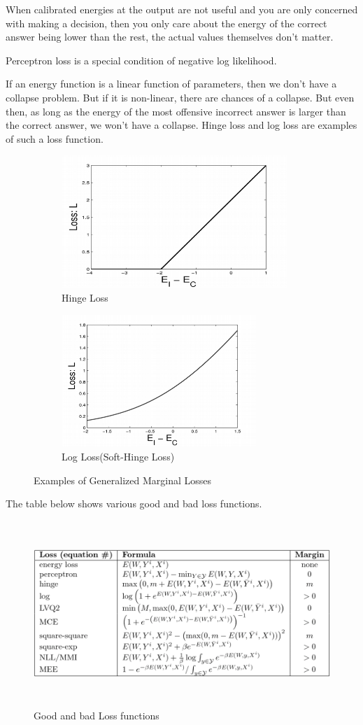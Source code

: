 When calibrated energies at the output are not useful and you are only concerned with making a decision, then you only care about the energy of the correct answer being lower than the rest, the actual values themselves don't matter.

Perceptron loss is a special condition of negative log likelihood.

If an energy function is a linear function of parameters, then we don't have a collapse problem. But if it is non-linear, there are chances of a collapse.
But even then, as long as  the energy of the most offensive incorrect answer is larger than the correct answer, we won't have a collapse. Hinge loss and log loss are examples of such a loss function. 

\begin{figure}[h]
 
\begin{subfigure}{0.5\textwidth}
\includegraphics[width=0.9\linewidth, height=5cm]{lectures/08-b/Hinge.png} 
\caption{Hinge Loss}
\label{fig:subim1}
\end{subfigure}
\begin{subfigure}{0.5\textwidth}
\includegraphics[width=0.9\linewidth, height=5cm]{lectures/08-b/Log_Loss.png}
\caption{Log Loss(Soft-Hinge Loss)}
\label{fig:subim2}
\end{subfigure}
 
\caption{Examples of Generalized Marginal Losses}
\label{fig:image2}
\end{figure}
\pagebreak The table below shows various good and bad loss functions.
\begin{figure}[ht]
\centering
\includegraphics[width=150mm,height=7cm]{lectures/08-b/Good_Bad_Loss.png}
\caption{Good and bad Loss functions}
\end{figure}
 